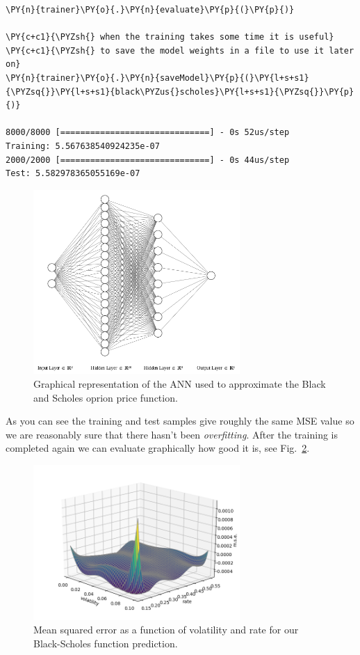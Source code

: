 \begin{codebox}[breakable, size=fbox, boxrule=1pt, pad at break*=1mm,colback=cellbackground, colframe=cellborder]
\begin{Verbatim}[commandchars=\\\{\}]
\PY{n}{trainer}\PY{o}{.}\PY{n}{evaluate}\PY{p}{(}\PY{p}{)}
	
\PY{c+c1}{\PYZsh{} when the training takes some time it is useful}
\PY{c+c1}{\PYZsh{} to save the model weights in a file to use it later on}
\PY{n}{trainer}\PY{o}{.}\PY{n}{saveModel}\PY{p}{(}\PY{l+s+s1}{\PYZsq{}}\PY{l+s+s1}{black\PYZus{}scholes}\PY{l+s+s1}{\PYZsq{}}\PY{p}{)}

8000/8000 [==============================] - 0s 52us/step
Training: 5.567638540924235e-07
2000/2000 [==============================] - 0s 44us/step
Test: 5.582978365055169e-07
\end{Verbatim}
\end{codebox}

\begin{figure}[htb]
	\centering
	\includegraphics[width=0.7\textwidth]{figures/ann_2.png}
	\caption{Graphical representation of the ANN used to approximate the Black and Scholes oprion price function.}
        \label{fig:ann_2}
\end{figure}

As you can see the training and test samples give roughly the same MSE
value so we are reasonably sure that there hasn't been
\emph{overfitting}.
After the training is completed again we can
evaluate graphically how good it is, see Fig.~\ref{fig:vol_rate}. 

\begin{figure}[htb]
	\centering
	\includegraphics[width=0.7\textwidth]{figures/vol_rate}
	\caption{Mean squared error as a function of volatility and rate for our Black-Scholes function prediction.}
	\label{fig:vol_rate}
\end{figure}

